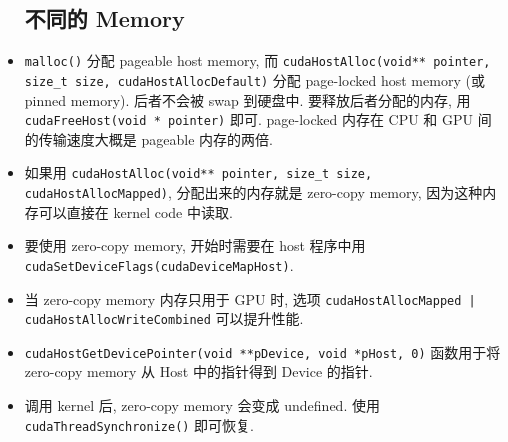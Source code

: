 \begin{itemize}
\subsection{不同的 Memory}
\item \verb`malloc()` 分配 pageable host memory, 而 \verb`cudaHostAlloc(void** pointer, size_t size, cudaHostAllocDefault)` 分配 page-locked host memory (或 pinned memory). 后者不会被 swap 到硬盘中. 要释放后者分配的内存, 用 \verb`cudaFreeHost(void * pointer)` 即可. page-locked 内存在 CPU 和 GPU 间的传输速度大概是 pageable 内存的两倍.
\item 如果用 \verb`cudaHostAlloc(void** pointer, size_t size, cudaHostAllocMapped)`, 分配出来的内存就是 zero-copy memory, 因为这种内存可以直接在 kernel code 中读取.
\item 要使用 zero-copy memory, 开始时需要在 host 程序中用 \verb`cudaSetDeviceFlags(cudaDeviceMapHost)`.
\item 当 zero-copy memory 内存只用于 GPU 时, 选项 \verb`cudaHostAllocMapped | cudaHostAllocWriteCombined` 可以提升性能.
\item \verb`cudaHostGetDevicePointer(void **pDevice, void *pHost, 0)` 函数用于将 zero-copy memory 从 Host 中的指针得到 Device 的指针.
\item 调用 kernel 后, zero-copy memory 会变成 undefined. 使用 \verb`cudaThreadSynchronize()` 即可恢复.
\end{itemize}
